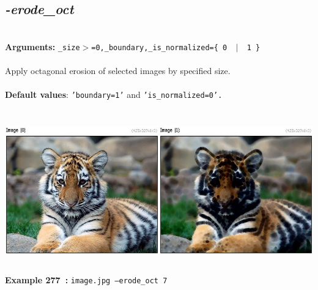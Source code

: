 \documentclass[a4paper,11pt,twoside]{book}
\begin{document}
\subsection{\emph{-erode\_oct} }\vspace*{-0.5em}
~\\\textbf{Arguments: } 
{\small \texttt{\_size$>$=0,\_boundary,\_is\_normalized=\{ 0 ~$|$~ 1 \}}}\\~\\
Apply octagonal erosion of selected images by specified size.
~\\~\\\textbf{Default values}: {\small \texttt{'boundary=1'} and \texttt{'is\_normalized=0'.}}
\begin{center}\includegraphics[keepaspectratio=true,height=7cm,width=\textwidth]{img/gmic_def277.jpg}\\
{\footnotesize \textbf{Example 277~:} \texttt{image.jpg --erode\_oct 7}}
\end{center}
\end{document}
